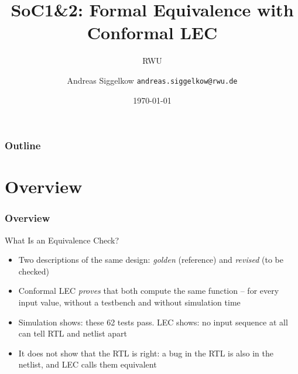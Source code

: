 \documentclass{beamer}
\title{SoC1\&2: Formal Equivalence with Conformal LEC}
\author[AS]{Andreas Siggelkow \newline \texttt{andreas.siggelkow@rwu.de}}
\date[2026]{\today}
\subtitle{RWU}
\institute{Elektrotechnik und Informatik}
\newcommand{\astitle}{nix}
\newcommand{\assubtitle}{nix}
\begin{document}
\setcounter{tocdepth}{1}

\begin{frame}
  \titlepage
\end{frame}

\begin{frame}
  \frametitle{Outline}
  \tableofcontents
\end{frame}

\section{Overview}
\renewcommand{\astitle}{Overview}

\renewcommand{\assubtitle}{What Is an Equivalence Check?}
\begin{frame}
\frametitle{\astitle}
\begin{block}{\assubtitle}
  \begin{itemize}
    \item Two descriptions of the same design: \emph{golden} (reference)
      and \emph{revised} (to be checked)
    \item Conformal LEC \emph{proves} that both compute the same function
      -- for every input value, without a testbench and without
      simulation time
    \item Simulation shows: these 62 tests pass. LEC shows: no input
      sequence at all can tell RTL and netlist apart
    \item It does not show that the RTL is right: a bug in the RTL is also
      in the netlist, and LEC calls them equivalent
  \end{itemize}
\end{block}
\end{frame}
\end{document}
